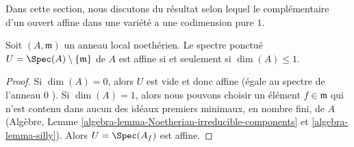 \noindent
Dans cette section, nous discutons du résultat selon lequel le complémentaire d'un
ouvert affine dans une variété a une codimension pure  $1$.

\begin{lemma}
\label{lemma-affine-punctured-spec}
Soit  $(A, \mathfrak m)$  un anneau local noethérien. Le spectre ponctué  $U = \Spec(A) \setminus \{\mathfrak m\}$  de
 $A$  est affine si et seulement si  $\dim(A) \leq 1$.
\end{lemma}

\begin{proof}
Si  $\dim(A) = 0$, alors  $U$  est vide et donc affine (égale au spectre de
l'anneau  $0$ ). Si  $\dim(A) = 1$, alors nous pouvons choisir un élément
 $f \in \mathfrak m$  qui n'est contenu dans aucun des idéaux premiers minimaux, en nombre fini,
de  $A$  (Algèbre, Lemme  \ref{algebra-lemma-Noetherian-irreducible-components}  et  \ref{algebra-lemma-silly}). Alors  $U = \Spec(A_f)$ 
est affine.


\end{proof}
